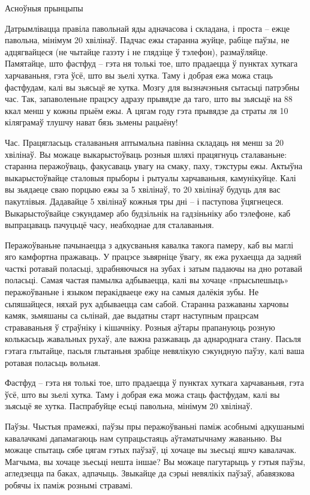 Асноўныя прынцыпы

Датрымлівацца правіла павольнай яды адначасова і складана, і проста – ежце павольна, мінімум 20 хвілінаў. Падчас ежы старанна жуйце, рабіце паўзы, не адцягвайцеся (не чытайце газэту і не глядзіце ў тэлефон), размаўляйце. Памятайце, што фастфуд – гэта ня толькі тое, што прадаецца ў пунктах хуткага харчаваньня, гэта ўсё, што вы зьелі хутка. Таму і добрая ежа можа стаць фастфудам, калі вы зьясьцё яе хутка.
Мозгу для вызначэньня сытасьці патрэбны час. Так, запаволеньне працэсу адразу прывядзе да таго, што вы зьясьцё на 88 ккал менш у кожны прыём ежы. А цягам году гэта прывядзе да страты ля 10 кіляграмаў тлушчу нават бязь зьмены рацыёну!

Час.
Працягласьць сталаваньня аптымальна павінна складаць ня менш за 20 хвілінаў. Вы можаце выкарыстоўваць розныя шляхі працягнуць сталаваньне: старанна перажоўваць, факусаваць увагу на смаку, паху, тэкстуры ежы. Актыўна выкарыстоўвайце сталовыя прыборы і рытуалы харчаваньня, камунікуйце. Калі вы зьядаеце сваю порцыю ежы за 5 хвілінаў, то 20 хвілінаў будуць для вас пакутлівыя. Дадавайце 5 хвілінаў кожныя тры дні – і паступова ўцягнецеся. Выкарыстоўвайце сэкундамер або будзільнік на гадзіньніку або тэлефоне, каб выпрацаваць пачуцьцё часу, неабходнае для сталаваньня.

Перажоўваньне пачынаецца з адкусваньня кавалка такога памеру, каб вы маглі яго камфортна пражаваць. У працэсе зьвярніце ўвагу, як ежа рухаецца да задняй часткі ротавай поласьці, здрабняючыся на зубах і затым падаючы на дно ротавай поласьці. Самая частая памылка адбываецца, калі вы хочаце «прысьпешыць» перажоўваньне і языком перакідваеце ежу на самыя далёкія зубы. Не сьпяшайцеся, няхай рух адбываецца сам сабой. Старанна разжаваны харчовы камяк, зьмяшаны са сьлінай, дае выдатны старт наступным працэсам страваваньня ў страўніку і кішачніку. Розныя аўтары прапануюць розную колькасьць жавальных рухаў, але важна разжаваць да аднароднага стану. Пасьля гэтага глытайце, пасьля глытаньня зрабіце невялікую сэкундную паўзу, калі ваша ротавая поласьць вольная.

Фастфуд – гэта ня толькі тое, што прадаецца ў пунктах хуткага харчаваньня, гэта ўсё, што вы зьелі хутка. Таму і добрая ежа можа стаць фастфудам, калі вы зьясьцё яе хутка. Паспрабуйце есьці павольна, мінімум 20 хвілінаў.

Паўзы.
Чыстыя прамежкі, паўзы пры перажоўваньні паміж асобнымі адкушанымі кавалачкамі дапамагаюць нам супрацьстаяць аўтаматычнаму жаваньню. Вы можаце спытаць сябе цягам гэтых паўзаў, ці хочаце вы зьесьці яшчэ кавалачак. Магчыма, вы хочаце зьесьці нешта іншае? Вы можаце пагутарыць у гэтыя паўзы, агледзецца па баках, адпачыць. Звыкайце да сэрыі невялікіх паўзаў, абавязкова робячы іх паміж рознымі стравамі.

